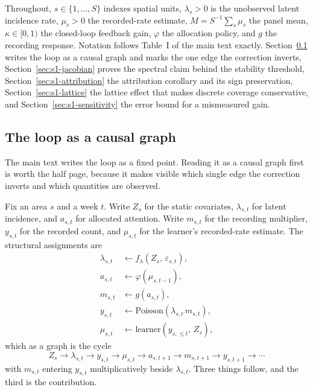 \documentclass[journal,10pt,onecolumn]{IEEEtran}
\begin{document}
Throughout, $s \in \{1,\dots,S\}$ indexes spatial units, $\lambda_s > 0$ is the
unobserved latent incidence rate, $\mu_s > 0$ the recorded-rate estimate,
$M = S^{-1}\sum_s \mu_s$ the panel mean, $\kappa \in [0,1)$ the closed-loop
feedback gain, $\varphi$ the allocation policy, and $g$ the recording response.
Notation follows Table~I of the main text exactly.
Section~\ref{sec:s1-scm} writes the loop as a causal graph and marks the one edge
the correction inverts, Section~\ref{sec:s1-jacobian}
proves the spectral claim behind the stability threshold,
Section~\ref{sec:s1-attribution} the attribution corollary and its sign
preservation, Section~\ref{sec:s1-lattice} the lattice effect that makes discrete
coverage conservative, and Section~\ref{sec:s1-sensitivity} the error bound for a
mismeasured gain.

\subsection{The loop as a causal graph}
\label{sec:s1-scm}

The main text writes the loop as a fixed point. Reading it as a causal graph
first is worth the half page, because it makes visible which single edge the
correction inverts and which quantities are observed.

Fix an area $s$ and a week $t$. Write $Z_s$ for the static covariates,
$\lambda_{s,t}$ for latent incidence, and $a_{s,t}$ for allocated attention. Write
$m_{s,t}$ for the recording multiplier, $y_{s,t}$ for the recorded count, and
$\mu_{s,t}$ for the learner's recorded-rate estimate. The structural assignments
are
\begin{align}
\lambda_{s,t} &\leftarrow f_{\lambda}(Z_s,\, \varepsilon_{s,t}),
\label{eq:s-scm-lambda}\\
a_{s,t} &\leftarrow \varphi(\mu_{s,t-1}),
\label{eq:s-scm-a}\\
m_{s,t} &\leftarrow g(a_{s,t}),
\label{eq:s-scm-m}\\
y_{s,t} &\leftarrow \mathrm{Poisson}\!\left(\lambda_{s,t}\, m_{s,t}\right),
\label{eq:s-scm-y}\\
\mu_{s,t} &\leftarrow \mathrm{learner}\!\left(y_{s,\le t},\, Z_s\right),
\label{eq:s-scm-mu}
\end{align}
which as a graph is the cycle
\begin{equation}
\label{eq:s-dag}
Z_s \rightarrow \lambda_{s,t} \rightarrow y_{s,t} \rightarrow \mu_{s,t}
\rightarrow a_{s,t+1} \rightarrow m_{s,t+1} \rightarrow y_{s,t+1}
\rightarrow \cdots
\end{equation}
with $m_{s,t}$ entering $y_{s,t}$ multiplicatively beside $\lambda_{s,t}$. Three
things follow, and the third is the contribution.
\end{document}
